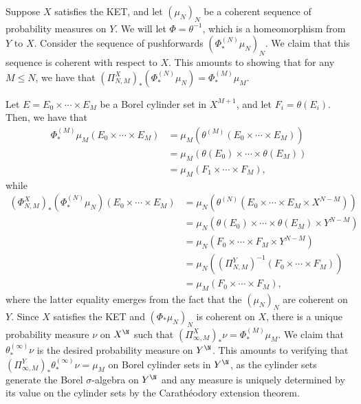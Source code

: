 \documentclass[10pt]{mypackage}
\begin{document}
\begin{solution}
  Suppose $X$ satisfies the KET, and let $\left( \mu_N \right)_{N}$ be a coherent sequence of probability measures on $Y$. We will let $\Phi = \theta^{-1}$, which is a homeomorphism from $Y$ to $X$. Consider the sequence of pushforwards $\left( \Phi^{(N)}_{\ast}\mu_N \right)_{N}$. We claim that this sequence is coherent with respect to $X$. This amounts to showing that for any $M\leq N$, we have that $\left( \Pi^X_{N,M} \right)_{\ast}\left( \Phi^{(N)}_{\ast}\mu_N \right) = \Phi^{(M)}_{\ast}\mu_M$.

  Let $E = E_0\times \cdots\times E_M$ be a Borel cylinder set in $X^{M+1}$, and let $F_i = \theta\left( E_i \right)$. Then, we have that
  \begin{align*}
    \Phi^{(M)}_{\ast}\mu_M\left( E_0\times\cdots\times E_M\right) &= \mu_M\left( \theta^{(M)}\left( E_0\times\cdots\times E_M \right) \right)\\
                                                                  &= \mu_M\left( \theta\left( E_0 \right)\times\cdots\times \theta\left( E_M \right) \right)\\
                                                                  &= \mu_M\left( F_1\times\cdots\times F_M \right),
  \end{align*}
  while
  \begin{align*}
    \left( \Phi^X_{N,M} \right)_{\ast}\left( \Phi^{(N)}_{\ast}\mu_N \right)\left( E_0\times\cdots\times E_M \right) &= \mu_N\left( \theta^{(N)}\left( E_0\times\cdots\times E_M\times X^{N-M} \right) \right)\\
                                        &= \mu_N\left( \theta\left( E_0 \right)\times\cdots\times \theta\left( E_M \right)\times Y^{N-M} \right)\\
                                        &= \mu_N\left( F_0\times\cdots\times F_M\times Y^{N-M} \right)\\
                                        &= \mu_N\left( \left( \Pi^Y_{N,M} \right)^{-1}\left( F_0\times\cdots\times F_M \right) \right)\\
                                        &= \mu_M\left( F_0\times\cdots\times F_M \right),
  \end{align*}
  where the latter equality emerges from the fact that the $\left( \mu_N \right)_{N}$ are coherent on $Y$. Since $X$ satisfies the KET and $\left( \Phi_{\ast}\mu_N \right)_{N}$ is coherent on $X$, there is a unique probability measure $\nu$ on $X^{\N}$ such that $\left( \Pi^{X}_{\infty,M} \right)_{\ast}\nu = \Phi^{(M)}_{\ast}\mu_{M}$. We claim that $\theta_{\ast}^{(\infty)}\nu$ is the desired probability measure on $Y^{\N}$. This amounts to verifying that $\left( \Pi^Y_{\infty,M} \right)_{\ast}\theta_{\ast}^{(\infty)}\nu = \mu_M$ on Borel cylinder sets in $Y^{\N}$, as the cylinder sets generate the Borel $\sigma$-algebra on $Y^{\N}$ and any measure is uniquely determined by its value on the cylinder sets by the Carathéodory extension theorem.


\end{solution}
\end{document}
